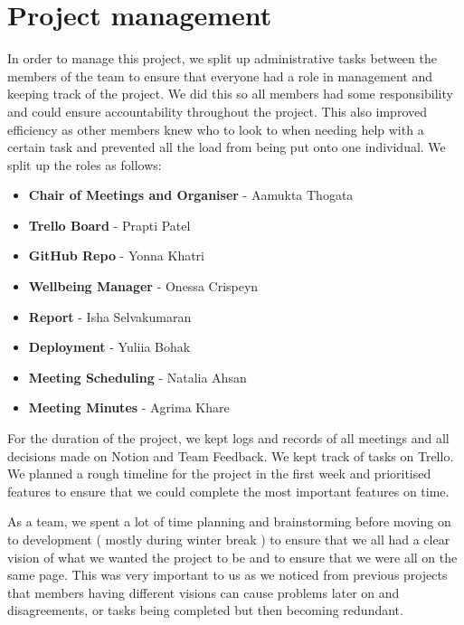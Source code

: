 \chapter{Project management}
\label{chap:project-management}

In order to manage this project, we split up administrative tasks between the members of the team to ensure that everyone had a role in management and keeping track of the project. We did this so all members had some responsibility and could ensure accountability throughout the project. This also improved efficiency as other members knew who to look to when needing help with a certain task and prevented all the load from being put onto one individual. We split up the roles as follows:


\begin{itemize}
    \item \textbf{Chair of Meetings and Organiser} - Aamukta Thogata
    \item \textbf{Trello Board} - Prapti Patel
    \item \textbf{GitHub Repo} - Yonna Khatri
    \item \textbf{Wellbeing Manager} - Onessa Crispeyn
    \item \textbf{Report} - Isha Selvakumaran
    \item \textbf{Deployment} - Yuliia Bohak
    \item \textbf{Meeting Scheduling} - Natalia Ahsan
    \item \textbf{Meeting Minutes} - Agrima Khare
\end{itemize}

\vspace{30pt}

For the duration of the project, we kept logs and records of all meetings and all decisions made on Notion and Team Feedback. We kept track of tasks on Trello. We planned a rough timeline for the project in the first week and prioritised features to ensure that we could complete the most important features on time.

As a team, we spent a lot of time planning and brainstorming before moving on to development ( mostly during winter break ) to ensure that we all had a clear vision of what we wanted the project to be and to ensure that we were all on the same page. This was very important to us as we noticed from previous projects that members having different visions can cause problems later on and disagreements, or tasks being completed but then becoming redundant.

